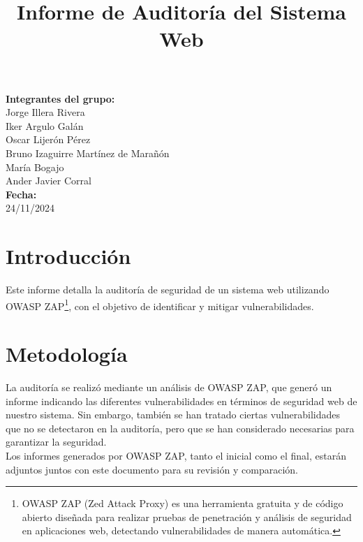 \documentclass[a4paper,12pt]{article}
\title{Informe de Auditoría del Sistema Web}
\date{}  %
\begin{document}
	\maketitle
	\vfill  %
	\begin{flushright}  %
		\textbf{Integrantes del grupo:} \\[0.5em]
		Jorge Illera Rivera \\[0.5em]
		Iker Argulo Galán \\[0.5em]
		Oscar Lijerón Pérez \\[0.5em]
		Bruno Izaguirre Martínez de Marañón \\[0.5em]
		María Bogajo \\[0.5em]
		Ander Javier Corral \\[0.5em]
		\textbf{Fecha:} \\[0.5em]
		24/11/2024
	\end{flushright}
	\newpage
	
	
\tableofcontents
\listoffigures
\newpage
	
\section{Introducción}
Este informe detalla la auditoría de seguridad de un sistema web utilizando OWASP ZAP\footnote{OWASP ZAP (Zed Attack Proxy) es una herramienta gratuita y de código abierto diseñada para realizar pruebas de penetración y análisis de seguridad en aplicaciones web, detectando vulnerabilidades de manera automática.\cite{zap}}, con el objetivo de identificar y mitigar vulnerabilidades.
\vspace{1em}
	
\section{Metodología}
La auditoría se realizó mediante un análisis de OWASP ZAP, que generó un informe indicando las diferentes vulnerabilidades en términos de seguridad web de nuestro sistema. Sin embargo, también se han tratado ciertas vulnerabilidades que no se detectaron en la auditoría, pero que se han considerado necesarias para garantizar la seguridad.\\

Los informes generados por OWASP ZAP, tanto el inicial como el final, estarán adjuntos juntos con este documento para su revisión y comparación.
\vspace{1em}
\end{document}
